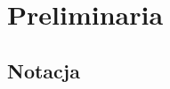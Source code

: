 \documentclass[12pt,a4paper]{report}
\begin{document}






\chapter{Preliminaria}  

\section{Notacja} 
\end{document}
